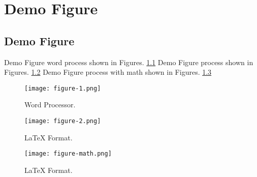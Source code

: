 \chapter{Demo Figure}
\section{Demo Figure}
Demo Figure word process shown in Figures. \ref{fig:wordProcess}
Demo Figure \latex process shown in Figures. \ref{fig:latexProcess}
Demo Figure \latex process with math shown in Figures. \ref{fig:latexProcessMath}

\begin{figure}[h]
  \centering
  \texttt{[image: figure-1.png]}
  \caption{Word Processor.}
  \label{fig:wordProcess}
\end{figure}

\begin{figure}[h]
  \centering
  \texttt{[image: figure-2.png]}
  \caption{\LaTeX{} Format.}
  \label{fig:latexProcess}
\end{figure}

\begin{figure}[h]
  \centering
  \texttt{[image: figure-math.png]}
  \caption{\LaTeX{} Format.}
  \label{fig:latexProcessMath}
\end{figure}